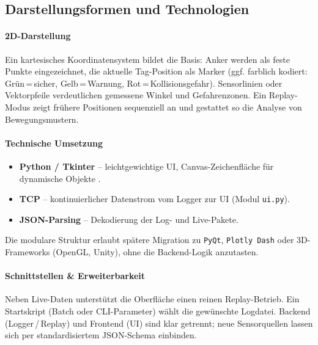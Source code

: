 \documentclass[a4paper, 12pt]{article} %
\begin{document}
\subsection{Darstellungsformen und Technologien}

\paragraph{2D-Darstellung}

Ein kartesisches Koordinatensystem bildet die Basis:  
Anker werden als feste Punkte eingezeichnet, die aktuelle Tag-Position als Marker (ggf. farblich kodiert: Grün\,=\,sicher, Gelb\,=\,Warnung, Rot\,=\,Kollisionsgefahr).
Sensorlinien oder Vektorpfeile verdeutlichen gemessene Winkel und Gefahrenzonen.  
Ein Replay-Modus zeigt frühere Positionen sequenziell an und gestattet so die Analyse von Bewegungs­mustern.

\paragraph{Technische Umsetzung}

\begin{itemize}[leftmargin=2em]
  \item \textbf{Python / Tkinter} – leichtgewichtige \ac{UI}, Canvas-Zeichenfläche für dynamische Objekte \cite{tkinter_book}. 
  \item \textbf{\ac{TCP}} – kontinuierlicher Datenstrom vom Logger zur \ac{UI} (Modul \texttt{ui.py}).
  \item \textbf{\ac{JSON}-Parsing} – Dekodierung der Log- und Live-Pakete.
\end{itemize}

Die modulare Struktur erlaubt spätere Migration zu \texttt{PyQt}, \texttt{Plotly Dash} oder 3D-Frameworks (OpenGL, Unity), ohne die Backend-Logik anzutasten.

\paragraph{Schnittstellen \& Erweiterbarkeit}

Neben Live-Daten unterstützt die Oberfläche einen reinen Replay-Betrieb. Ein Startskript (Batch oder CLI-Parameter) wählt die gewünschte Logdatei.  
Backend (Logger\,/\,Replay) und Frontend (\ac{UI}) sind klar getrennt; neue Sensorquellen lassen sich per standardisiertem \ac{JSON}-Schema einbinden.
\end{document}
